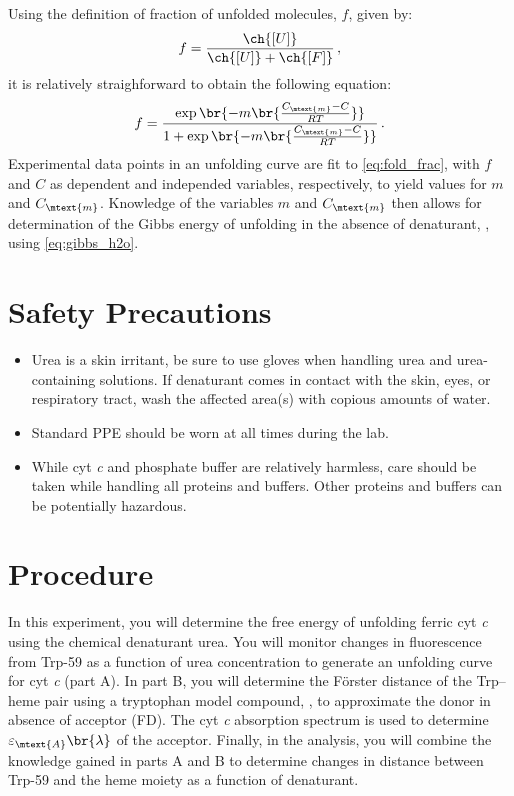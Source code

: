\documentclass[nobib,nofonts,nols,nohyper]{tufte-handout}
\begin{document}
Using the definition of fraction of unfolded molecules, \( f \), given by:
\begin{equation}
	f = \frac{\ch{[U]}}{\ch{[U]} + \ch{[F]}} \, ,
	\label{eq:conc_frac}
\end{equation}
it is relatively straighforward to obtain the following equation:
\begin{equation}
	f = \frac{ \exp\br{ -m \br{\frac{C_\mtext{m} - C}{RT}}}}{1 + \exp\br{-m \br{\frac{C_\mtext{m} - C}{RT}}}} \, .
	\label{eq:fold_frac}
\end{equation}
Experimental data points in an unfolding curve are fit to \cref{eq:fold_frac}, with \( f \) and \( C \) as dependent and independed variables, respectively, to yield values for \( m \) and \( C_\mtext{m} \). 
Knowledge of the variables \( m \) and \( C_\mtext{m} \) then allows for determination of the Gibbs energy of unfolding in the absence of denaturant, \gibbs*[subscript-right=\ch{H2O}], using \cref{eq:gibbs_h2o}.



\section{Safety Precautions} %
\label{sec:safety_precautions}

\begin{itemize}
	\item Urea is a skin irritant, be sure to use gloves when handling urea and urea-containing solutions. If denaturant comes in contact with the skin, eyes, or respiratory tract, wash the affected area(s) with copious amounts of water. 
	\item Standard PPE should be worn at all times during the lab. 
	\item While cyt \emph{c} and phosphate buffer are relatively harmless, care should be taken while handling all proteins and buffers. Other proteins and buffers can be potentially hazardous. 
\end{itemize}


\section{Procedure} %
\label{sec:procedure}

In this experiment, you will determine the free energy of unfolding ferric cyt \emph{c} using the chemical denaturant urea. 
You will monitor changes in fluorescence from Trp-59 as a function of urea concentration to generate an unfolding curve for cyt \emph{c} (part A).  
In part B, you will determine the Förster distance of the Trp--heme pair using a tryptophan model compound, , to approximate the donor in absence of acceptor (FD).  
The cyt \emph{c} absorption spectrum is used to determine \( \varepsilon_\mtext{A} \br{\lambda} \) of the acceptor. 
Finally, in the analysis, you will combine the knowledge gained in parts A and B to determine changes in distance between Trp-59 and the heme moiety as a function of denaturant. 
\end{document}
